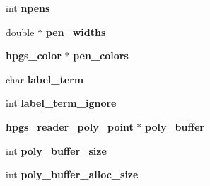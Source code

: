 \begin{Indent}{\bf }\par
{\em \label{_amgrpd41d8cd98f00b204e9800998ecf8427e}
 }\begin{DoxyCompactItemize}
\item 
int {\bf npens}
\item 
double $\ast$ {\bfseries pen\_\-widths}\label{structhpgs__reader__st_a41eff30329ceb411108cc8a621043c76}

\item 
{\bf hpgs\_\-color} $\ast$ {\bfseries pen\_\-colors}\label{structhpgs__reader__st_a81f41ebedb2bf9171fd0a01168d5bdc6}

\end{DoxyCompactItemize}
\end{Indent}
\begin{Indent}{\bf }\par
{\em \label{_amgrpd41d8cd98f00b204e9800998ecf8427e}
 }\begin{DoxyCompactItemize}
\item 
char {\bf label\_\-term}
\item 
int {\bfseries label\_\-term\_\-ignore}\label{structhpgs__reader__st_a9e54f7011e6a35f47903a8e132f1212a}

\end{DoxyCompactItemize}
\end{Indent}
\begin{Indent}{\bf }\par
{\em \label{_amgrpd41d8cd98f00b204e9800998ecf8427e}
 }\begin{DoxyCompactItemize}
\item 
{\bf hpgs\_\-reader\_\-poly\_\-point} $\ast$ {\bf poly\_\-buffer}
\item 
int {\bfseries poly\_\-buffer\_\-size}\label{structhpgs__reader__st_a23291d784cf75b1b3d1783182187056b}

\item 
int {\bfseries poly\_\-buffer\_\-alloc\_\-size}\label{structhpgs__reader__st_a92c9024e53ba5a600ffe4bd151d580d0}

\end{DoxyCompactItemize}
\end{Indent}
